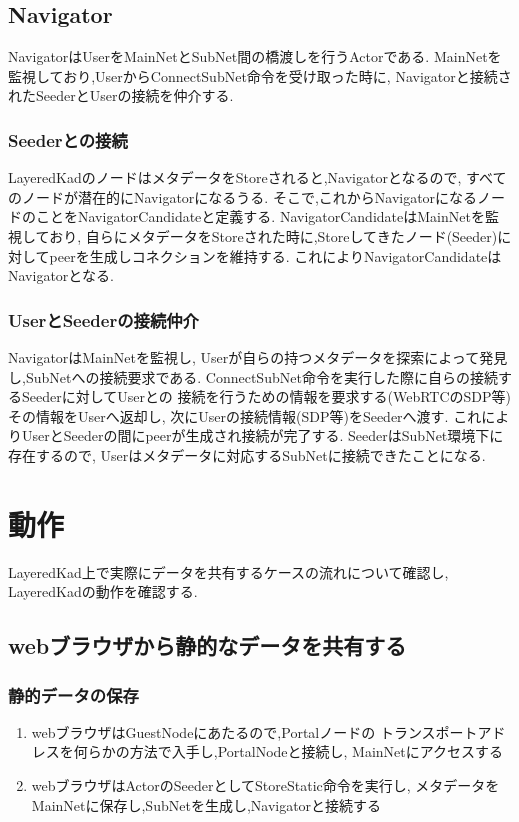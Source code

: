 \documentclass[sotsuron]{jcsie}
\begin{document}
\subsection{Navigator}
NavigatorはUserをMainNetとSubNet間の橋渡しを行うActorである.
MainNetを監視しており,UserからConnectSubNet命令を受け取った時に,
Navigatorと接続されたSeederとUserの接続を仲介する.

\subsubsection{Seederとの接続}
LayeredKadのノードはメタデータをStoreされると,Navigatorとなるので,
すべてのノードが潜在的にNavigatorになるうる.
そこで,これからNavigatorになるノードのことをNavigatorCandidateと定義する.
NavigatorCandidateはMainNetを監視しており,
自らにメタデータをStoreされた時に,Storeしてきたノード(Seeder)に
対してpeerを生成しコネクションを維持する.
これによりNavigatorCandidateはNavigatorとなる.

\subsubsection{UserとSeederの接続仲介}
NavigatorはMainNetを監視し,
Userが自らの持つメタデータを探索によって発見し,SubNetへの接続要求である.
ConnectSubNet命令を実行した際に自らの接続するSeederに対してUserとの
接続を行うための情報を要求する(WebRTCのSDP等)その情報をUserへ返却し,
次にUserの接続情報(SDP等)をSeederへ渡す.
これによりUserとSeederの間にpeerが生成され接続が完了する.
SeederはSubNet環境下に存在するので,
Userはメタデータに対応するSubNetに接続できたことになる.

\section{動作}
LayeredKad上で実際にデータを共有するケースの流れについて確認し,
LayeredKadの動作を確認する.

\subsection{webブラウザから静的なデータを共有する}
\subsubsection{静的データの保存}
\begin{enumerate}
	\item 
	      webブラウザはGuestNodeにあたるので,Portalノードの
	      トランスポートアドレスを何らかの方法で入手し,PortalNodeと接続し,
	      MainNetにアクセスする
	      \\
	\item
	      webブラウザはActorのSeederとしてStoreStatic命令を実行し,
	      メタデータをMainNetに保存し,SubNetを生成し,Navigatorと接続する	
\end{enumerate}
\end{document}
